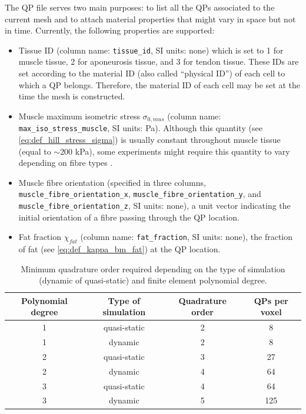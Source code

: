 \documentclass{sfuthesis}
\numberwithin{equation}{section}
\numberwithin{figure}{chapter}
\numberwithin{table}{chapter}
\theoremstyle{definition}
\begin{document}
The QP file serves two main purposes: to list all the QPs associated to the current mesh and to attach material properties that might vary in space but not in time. Currently, the following properties are supported:
\begin{itemize}
    \item Tissue ID (column name: \texttt{tissue\_id}, SI units: none) which is set to 1 for muscle tissue, 2 for aponeurosis tissue, and 3 for tendon tissue. These IDs are set according to the material ID (also called ``physical ID'') of each cell to which a QP belongs. Therefore, the material ID of each cell may be set at the time the mesh is constructed.
    \item Muscle maximum isometric stress $\sigma_{0,mus}$ (column name: \texttt{max\_iso\_stress\_muscle}, SI units: Pa). Although this quantity (see \eqref{eq:def_hill_stress_sigma}) is usually constant throughout muscle tissue (equal to $\sim$200 kPa), some experiments might require this quantity to vary depending on fibre types \cite{Bottinelli1999}.
    \item Muscle fibre orientation (specified in three columns, \texttt{muscle\_fibre\_orientation\_x}, \texttt{muscle\_fibre\_orientation\_y}, and \texttt{muscle\_fibre\_orientation\_z}, SI units: none), a unit vector indicating the initial orientation of a fibre passing through the QP location.
    \item Fat fraction $\chi_{fat}$ (column name: \texttt{fat\_fraction}, SI units: none), the fraction of fat (see \eqref{eq:def_kappa_bm_fat}) at the QP location.
\end{itemize}

\begin{table}
    \centering
    \begin{tabular}{|c|c|c|c|}\hline
        Polynomial degree & Type of simulation & Quadrature order & QPs per voxel \\\hline
        1 & quasi-static & 2 & 8 \\\hline
        1 & dynamic & 2 & 8 \\\hline
        2 & quasi-static & 3 & 27 \\\hline
        2 & dynamic & 4 & 64 \\\hline
        3 & quasi-static & 4 & 64 \\\hline
        3 & dynamic & 5 & 125 \\\hline
    \end{tabular}
    \caption{Minimum quadrature order required depending on the type of simulation (dynamic of quasi-static) and finite element polynomial degree.\label{tab:number_of_qp_points}}
\end{table}
\end{document}
